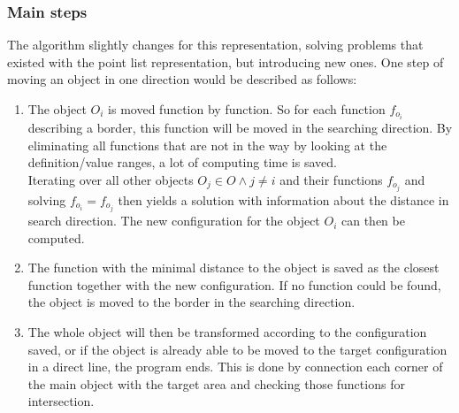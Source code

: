 \subsubsection{Main steps}
The algorithm slightly changes for this representation, solving problems that existed with the point list representation, but introducing new ones. One step of moving an object in one direction would be described as follows:
\begin{enumerate}
\item The object $O_i$ is moved function by function. So for each function $f_{o_i}$ describing a border, this function will be moved in the searching direction. By eliminating all functions that are not in the way by looking at the definition/value ranges, a lot of computing time is saved.\\ 
Iterating over all other objects $O_j \in O \wedge j \neq i$ and their functions $f_{o_j}$ and solving $f_{o_i} = f_{o_j}$ then yields a solution with information about the distance in search direction. The new configuration for the object $O_i$ can then be computed.
\item The function with the minimal distance to the object is saved as the closest function together with the new configuration. If no function could be found, the object is moved to the border in the searching direction.
\item The whole object will then be transformed according to the configuration saved, or if the object is already able to be moved to the target configuration in a direct line, the program ends. This is done by connection each corner of the main object with the target area and checking those functions for intersection.
\end{enumerate}

